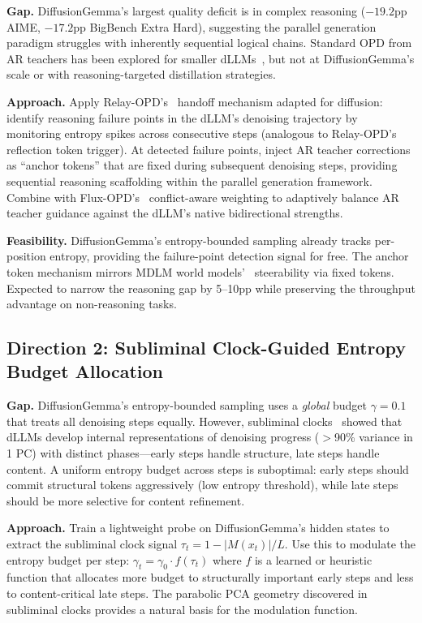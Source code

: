 \documentclass[11pt,a4paper]{article}
\begin{document}
\textbf{Gap.} DiffusionGemma's largest quality deficit is in complex reasoning ($-19.2$pp AIME, $-17.2$pp BigBench Extra Hard), suggesting the parallel generation paradigm struggles with inherently sequential logical chains. Standard OPD from AR teachers has been explored for smaller dLLMs~\cite{ar2diff2026}, but not at DiffusionGemma's scale or with reasoning-targeted distillation strategies.

\textbf{Approach.} Apply Relay-OPD's~\cite{relayopd2026} handoff mechanism adapted for diffusion: identify reasoning failure points in the dLLM's denoising trajectory by monitoring entropy spikes across consecutive steps (analogous to Relay-OPD's reflection token trigger). At detected failure points, inject AR teacher corrections as ``anchor tokens'' that are fixed during subsequent denoising steps, providing sequential reasoning scaffolding within the parallel generation framework. Combine with Flux-OPD's~\cite{fluxopd2026} conflict-aware weighting to adaptively balance AR teacher guidance against the dLLM's native bidirectional strengths.

\textbf{Feasibility.} DiffusionGemma's entropy-bounded sampling already tracks per-position entropy, providing the failure-point detection signal for free. The anchor token mechanism mirrors MDLM world models'~\cite{mdlmwm2026} steerability via fixed tokens. Expected to narrow the reasoning gap by 5--10pp while preserving the throughput advantage on non-reasoning tasks.

\subsection{Direction 2: Subliminal Clock-Guided Entropy Budget Allocation}

\textbf{Gap.} DiffusionGemma's entropy-bounded sampling uses a \emph{global} budget $\gamma = 0.1$ that treats all denoising steps equally. However, subliminal clocks~\cite{subliminalclocks2026} showed that dLLMs develop internal representations of denoising progress ($>$90\% variance in 1 PC) with distinct phases---early steps handle structure, late steps handle content. A uniform entropy budget across steps is suboptimal: early steps should commit structural tokens aggressively (low entropy threshold), while late steps should be more selective for content refinement.

\textbf{Approach.} Train a lightweight probe on DiffusionGemma's hidden states to extract the subliminal clock signal $\tau_t = 1 - |M(x_t)|/L$. Use this to modulate the entropy budget per step: $\gamma_t = \gamma_0 \cdot f(\tau_t)$ where $f$ is a learned or heuristic function that allocates more budget to structurally important early steps and less to content-critical late steps. The parabolic PCA geometry discovered in subliminal clocks provides a natural basis for the modulation function.
\end{document}
